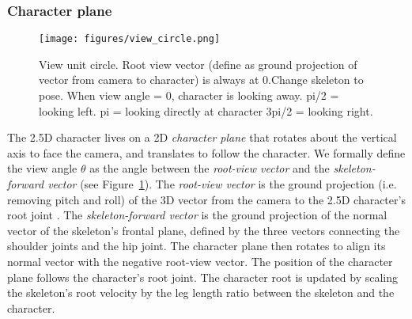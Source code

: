 \begin{comment}
\begin{algorithm}
\caption{Motion Retargeting}\label{alg:motion_retargeting}
\begin{algorithmic}[1] %
    \Procedure{Retarget}{characterModel, viewer, motion} %
        \State Generate2.5DCharacter(characterModel)


        \For{$pose \gets motion$}
            \State $\theta \gets$ GetViewingAngle(viewer, character)
            \State SetCharacterPlaneTraverseRotation($\theta$)
            \State SetLimbFlipping($\theta$)
            \State SetVisibleCharacterHalf($\theta$)
            \State ComputeRigJointLocations($\theta$, pose)
            \State SelectAndDeformCharacterMesh()
            \State ComputePartTransforms($\theta$)
            \State ComputeRenderingOrder($\theta$, pose)
            \State OffsetCharacterRoot(pose)
        \EndFor
    \EndProcedure
\end{algorithmic}

\end{algorithm}
\end{comment}

\subsubsection{Character plane}
\label{sec:retarget-plane}
\begin{figure}[ht]
\centering
\texttt{[image: figures/view\_circle.png]}
\caption{View unit circle.  Root view vector (define as ground projection of vector from camera to character) is always at 0.Change skeleton to pose. When view angle = 0, character is looking away. pi/2 = looking left. pi = looking directly at character 3pi/2 = looking right.}
\label{fig:view_circle}
\end{figure}

The 2.5D character lives on a 2D \textit{character plane} that rotates about the vertical axis to face the camera, and translates to follow the character. We formally define the view angle $\theta$ as the angle between the \textit{root-view vector} and the \textit{skeleton-forward vector} (see Figure~\ref{fig:view_circle}). The \textit{root-view vector} is the ground projection (i.e. removing pitch and roll) of the 3D vector from the camera to the 2.5D character's root joint
. The \textit{skeleton-forward vector} is the ground projection of the normal vector of the skeleton's frontal plane, defined by the three vectors connecting the shoulder joints and the hip joint. The character plane then rotates to align its normal vector with the negative root-view vector. The position of the character plane follows the character's root joint. The character root is updated by scaling the skeleton's root velocity by the leg length ratio between the skeleton and the character.

